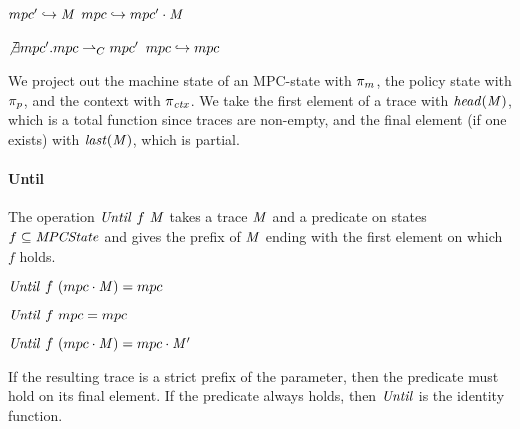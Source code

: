 \documentclass[acmsmall,review,anonymous]{acmart}\settopmatter{printfolios=true,printccs=false,printacmref=false}
\begin{document}
\begin{center}
\begin{minipage}{.4\textwidth}
            {\(mpc' \hookrightarrow \mathit{M}\)}
            {\(mpc \hookrightarrow mpc' \cdot \mathit{M}\)}%
\end{minipage}
\begin{minipage}{.4\textwidth}
\judgment%
         {\(\not\exists mpc'. mpc \overset{}{\rightharpoonup}_C mpc'\)}
         {\(mpc \hookrightarrow mpc\)}
\end{minipage}
\end{center}
%

We project out the machine state of an MPC-state with \(\pi_m\), the
policy state with \(\pi_p\), and the context with \(\pi_{\mathit{ctx}}\).
We take the first element of a trace with \(\mathit{head}(\mathit{M})\), which is a total
function since traces are non-empty, and the final element (if one exists) with
\(\mathit{last}(\mathit{M})\), which is partial.

\paragraph*{Until}
The operation \(\mathit{Until} ~ f ~ \mathit{M}\) takes a trace \(\mathit{M}\)
and a predicate on states \(f \subseteq \mathit{MPCState}\) and gives the prefix of
\(\mathit{M}\) ending with the first element on which \(f\) holds.

\begin{center}
  \begin{minipage}{.3\textwidth}
             {\(\mathit{Until} ~ f ~ (mpc \cdot \mathit{M}) = mpc\)}
  \end{minipage}
%
  \begin{minipage}{.3\textwidth}
    \judgment{}
             {\(\mathit{Until} ~ f ~ mpc = mpc\)}
%
  \end{minipage}
  \begin{minipage}{.3\textwidth}
                {\(\mathit{Until} ~ f ~ (mpc \cdot \mathit{M}) = mpc \cdot \mathit{M}'\)}
  \end{minipage}
\end{center}
%
If the resulting trace is a strict prefix of the parameter, then the
predicate must hold on its final element. If the predicate always holds, then
\(\mathit{Until}\) is the identity function.
\end{document}
